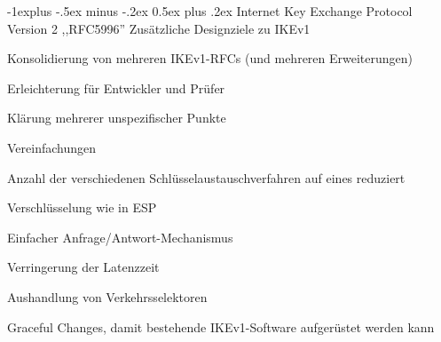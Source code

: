 \documentclass[a4paper]{article}
\makeatletter
\renewcommand{\subsection}{\@startsection{subsection}{2}{0mm}%
 {-1explus -.5ex minus -.2ex}%
 {0.5ex plus .2ex}%
 {\normalfont\normalsize\bfseries}}
\makeatother
\begin{document}
\begin{multicols}{3}
\begin{itemize*}
            \subsection{Internet Key Exchange Protocol Version 2
                  ,,RFC5996''}
            Zusätzliche Designziele zu IKEv1
            \begin{itemize*}
                  \item Konsolidierung von mehreren IKEv1-RFCs (und mehreren Erweiterungen)
                  \begin{itemize*}
                        \item Erleichterung für Entwickler und Prüfer
                        \item Klärung mehrerer unspezifischer Punkte
                  \end{itemize*}
                  \item Vereinfachungen
                  \begin{itemize*}
                        \item Anzahl der verschiedenen Schlüsselaustauschverfahren auf eines reduziert
                        \item Verschlüsselung wie in ESP
                        \item Einfacher Anfrage/Antwort-Mechanismus
                  \end{itemize*}
                  \item Verringerung der Latenzzeit
                  \item Aushandlung von Verkehrsselektoren
                  \item Graceful Changes, damit bestehende IKEv1-Software aufgerüstet werden
                  kann
            \end{itemize*}


\end{itemize*}
\end{multicols}
\end{document}
